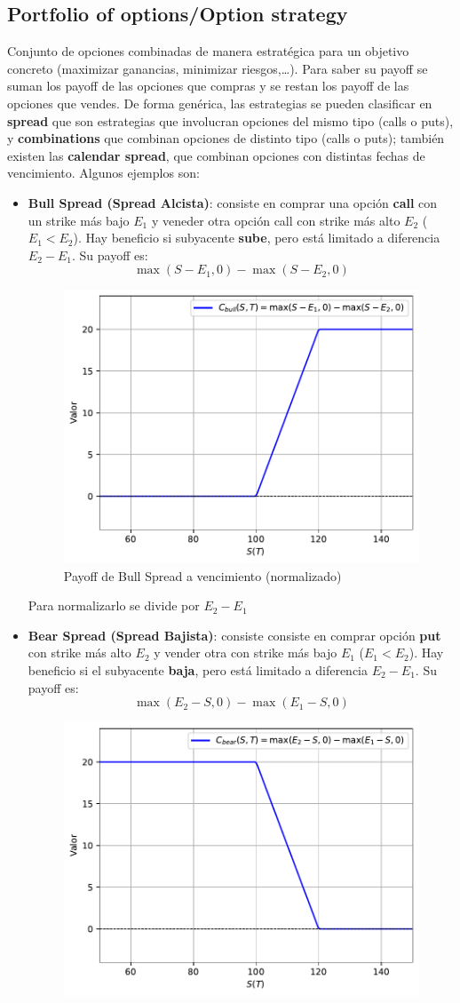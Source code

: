 \subsection{Portfolio of options/Option strategy}
Conjunto de opciones combinadas de manera estratégica para un objetivo concreto (maximizar ganancias, minimizar riesgos,\dots). Para saber su payoff se suman los payoff de las opciones que compras y se restan los payoff de las opciones que vendes. De forma genérica, las estrategias se pueden clasificar en \textbf{spread} que son estrategias que involucran opciones del mismo tipo (calls o puts), y \textbf{combinations} que combinan opciones de distinto tipo (calls o puts); también existen las \textbf{calendar spread}, que combinan opciones con distintas fechas de vencimiento. Algunos ejemplos son:
\begin{itemize}
    \item \textbf{Bull Spread (Spread Alcista)}: consiste en comprar una opción \textbf{call} con un strike más bajo $E_1$ y veneder otra opción call con strike más alto $E_2$  ($E_1<E_2$). Hay beneficio si subyacente \textbf{sube}, pero está limitado a diferencia $E_2-E_1$. Su payoff es:
    \[\boxed{\max(S-E_1, 0) - \max(S-E_2, 0)}\]
    \begin{figure}[H]
        \centering
        \includegraphics[width=0.5\linewidth]{Imagenes/Parte1/2_Derivados/BullPayoff.pdf}
        \caption{Payoff de Bull Spread a vencimiento (normalizado)}
    \end{figure}
    Para normalizarlo se divide por $E_2-E_1$
    \item \textbf{Bear Spread (Spread Bajista)}: consiste consiste en comprar opción \textbf{put} con strike más alto $E_2$ y vender otra con strike más bajo $E_1$ ($E_1<E_2$). Hay beneficio si el subyacente \textbf{baja}, pero está limitado a diferencia $E_2-E_1$. Su payoff es:
     \[\boxed{\max(E_2-S, 0) - \max(E_1-S, 0)}\]
    \begin{figure}[H]
        \centering
        \includegraphics[width=0.5\linewidth]{Imagenes/Parte1/2_Derivados/BearPayoff.pdf}

\end{figure}
\end{itemize}
